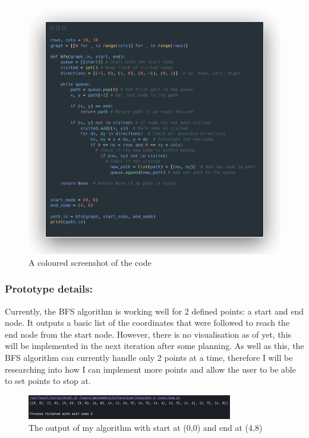 \begin{figure}[htbp!]
    \centering
    \includegraphics[width=1\linewidth]{Images/Source Code Image (2).png}
    \caption{A coloured screenshot of the code}
\end{figure}
\textbf{}\newline
\newpage

\subsubsection{Prototype details:} 
Currently, the BFS algorithm is working well for 2 defined points: a start and end node. It outputs a basic list of the coordinates that were followed to reach the end node from the start node. However, there is no visualisation as of yet, this will be implemented in the next iteration after some planning. As well as this, the BFS algorithm can currently handle only 2 points at a time, therefore I will be researching into how I can implement more points and allow the user to be able to set points to stop at.
\begin{figure}[htbp]
    \centering
    \includegraphics[width=0.8\textwidth]{Images/Screenshot 2025-03-30 at 11.18.52.png}
    \caption{The output of my algorithm with start at (0,0) and end at (4,8)}
\end{figure}

